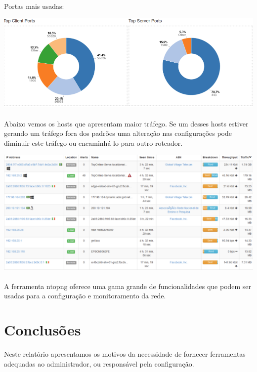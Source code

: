 \documentclass[a4paper]{article}
\begin{document}
 Portas mais usadas:
 
  \includegraphics[scale = 0.35]{ntop4.png}
    
   \paragraph{} Abaixo vemos os hosts que apresentam maior tráfego. Se um desses hosts estiver gerando um tráfego fora dos padrões uma alteração nas configurações pode diminuir este tráfego ou encaminhá-lo para outro roteador.
    
    \includegraphics[scale = 0.35]{ntop5.png}
    
   \paragraph{} A ferramenta ntopng oferece uma gama grande de funcionalidades que podem ser usadas para a configuração e monitoramento da rede.
    
    \section{Conclusões}
  \paragraph{}
  Neste relatório apresentamos os motivos da necessidade de fornecer ferramentas adequadas ao administrador, ou responsável pela configuração.
  
\end{document}
